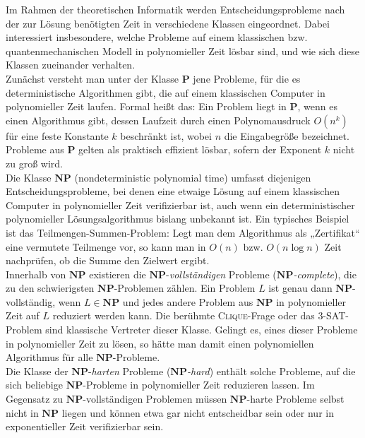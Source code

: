Im Rahmen der theoretischen Informatik werden Entscheidungsprobleme nach der zur Lösung benötigten Zeit in verschiedene Klassen eingeordnet. Dabei interessiert insbesondere, welche Probleme auf einem klassischen bzw. quantenmechanischen Modell in polynomieller Zeit lösbar sind, und wie sich diese Klassen zueinander verhalten.\\

Zunächst versteht man unter der Klasse \(\mathbf{P}\) jene Probleme, für die es deterministische Algorithmen gibt, die auf einem klassischen Computer in polynomieller Zeit laufen. Formal heißt das: Ein Problem liegt in \(\mathbf{P}\), wenn es einen Algorithmus gibt, dessen Laufzeit durch einen Polynomausdruck \(O(n^k)\) für eine feste Konstante \(k\) beschränkt ist, wobei \(n\) die Eingabegröße bezeichnet. Probleme aus \(\mathbf{P}\) gelten als praktisch effizient lösbar, sofern der Exponent \(k\) nicht zu groß wird.\\

Die Klasse \(\mathbf{NP}\) (nondeterministic polynomial time) umfasst diejenigen Entscheidungsprobleme, bei denen eine etwaige Lösung auf einem klassischen Computer in polynomieller Zeit verifizierbar ist, auch wenn ein deterministischer polynomieller Lösungsalgorithmus bislang unbekannt ist. Ein typisches Beispiel ist das Teilmengen-Summen-Problem: Legt man dem Algorithmus als „Zertifikat“ eine vermutete Teilmenge vor, so kann man in \(O(n)\) bzw. \(O(n\log n)\) Zeit nachprüfen, ob die Summe den Zielwert ergibt.\\

Innerhalb von \(\mathbf{NP}\) existieren die \(\mathbf{NP}\)-\emph{vollständigen} Probleme (\(\mathbf{NP}\)\emph{-complete}), die zu den schwierigsten \(\mathbf{NP}\)-Problemen zählen. Ein Problem \(L\) ist genau dann \(\mathbf{NP}\)-vollständig, wenn \(L\in\mathbf{NP}\) und jedes andere Problem aus \(\mathbf{NP}\) in polynomieller Zeit auf \(L\) reduziert werden kann. Die berühmte \textsc{Clique}-Frage oder das \textsc{3-SAT}-Problem sind klassische Vertreter dieser Klasse. Gelingt es, eines dieser Probleme in polynomieller Zeit zu lösen, so hätte man damit einen polynomiellen Algorithmus für alle \(\mathbf{NP}\)-Probleme.\\

Die Klasse der \(\mathbf{NP}\)-\emph{harten} Probleme (\(\mathbf{NP}\)\emph{-hard}) enthält solche Probleme, auf die sich beliebige \(\mathbf{NP}\)-Probleme in polynomieller Zeit reduzieren lassen. Im Gegensatz zu \(\mathbf{NP}\)-vollständigen Problemen müssen \(\mathbf{NP}\)-harte Probleme selbst nicht in \(\mathbf{NP}\) liegen und können etwa gar nicht entscheidbar sein oder nur in exponentieller Zeit verifizierbar sein.\\

